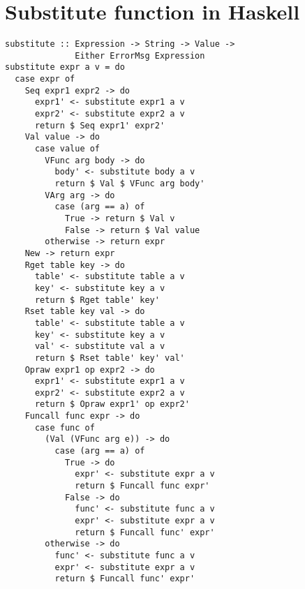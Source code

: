 \chapter{Substitute function in Haskell\label{app:substitute}}

\begin{verbatim}
substitute :: Expression -> String -> Value -> 
              Either ErrorMsg Expression
substitute expr a v = do
  case expr of
    Seq expr1 expr2 -> do
      expr1' <- substitute expr1 a v
      expr2' <- substitute expr2 a v
      return $ Seq expr1' expr2'
    Val value -> do
      case value of
        VFunc arg body -> do
          body' <- substitute body a v
          return $ Val $ VFunc arg body'
        VArg arg -> do
          case (arg == a) of
            True -> return $ Val v
            False -> return $ Val value
        otherwise -> return expr
    New -> return expr
    Rget table key -> do
      table' <- substitute table a v
      key' <- substitute key a v
      return $ Rget table' key'
    Rset table key val -> do
      table' <- substitute table a v
      key' <- substitute key a v
      val' <- substitute val a v
      return $ Rset table' key' val'
    Opraw expr1 op expr2 -> do
      expr1' <- substitute expr1 a v
      expr2' <- substitute expr2 a v
      return $ Opraw expr1' op expr2'
    Funcall func expr -> do
      case func of
        (Val (VFunc arg e)) -> do
          case (arg == a) of
            True -> do
              expr' <- substitute expr a v
              return $ Funcall func expr'
            False -> do
              func' <- substitute func a v
              expr' <- substitute expr a v
              return $ Funcall func' expr'
        otherwise -> do
          func' <- substitute func a v
          expr' <- substitute expr a v
          return $ Funcall func' expr'

\end{verbatim}